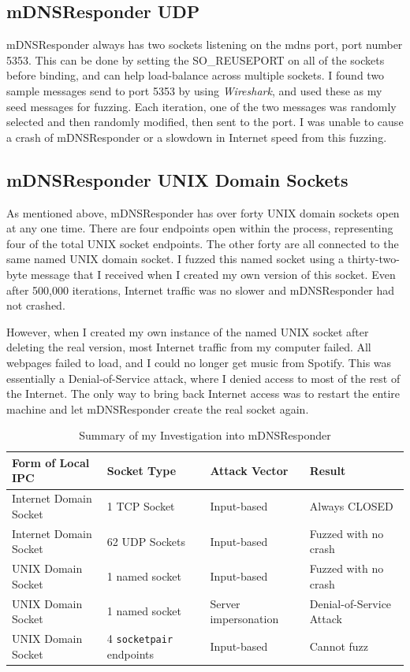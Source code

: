 \subsection{mDNSResponder UDP}
\label{sec:mdnsUdp}
mDNSResponder always has two sockets listening on the mdns port, port number 5353.  This can be done by setting the SO\_REUSEPORT on all of the sockets before binding, and can help load-balance across multiple sockets.  I found two sample messages send to port 5353 by using \textit{Wireshark}, and used these as my seed messages for fuzzing.  Each iteration, one of the two messages was randomly selected and then randomly modified, then sent to the port.  I was unable to cause a crash of mDNSResponder or a slowdown in Internet speed from this fuzzing.

\subsection{mDNSResponder UNIX Domain Sockets}
\label{sec:mdnsUnix}
As mentioned above, mDNSResponder has over forty UNIX domain sockets open at any one time.  There are four endpoints open within the process, representing four of the total UNIX socket endpoints.  The other forty are all connected to the same named UNIX domain socket.  I fuzzed this named socket using a thirty-two-byte message that I received when I created my own version of this socket.  Even after 500,000 iterations, Internet traffic was no slower and mDNSResponder had not crashed.

However, when I created my own instance of the named UNIX socket after deleting the real version, most Internet traffic from my computer failed.  All webpages failed to load, and I could no longer get music from Spotify.  This was essentially a Denial-of-Service attack, where I denied access to most of the rest of the Internet.  The only way to bring back Internet access was to restart the entire machine and let mDNSResponder create the real socket again.

\begin{table}
\centering
\begin{scriptsize}
\begin{tabular}{ l | l | l | l }
\textbf{Form of Local IPC} & \textbf{Socket Type} & \textbf{Attack Vector} & \textbf{Result} \\ \hline
Internet Domain Socket & 1 TCP Socket & Input-based & Always CLOSED \\ \hline
Internet Domain Socket & 62 UDP Sockets & Input-based & Fuzzed with no crash \\ \hline
UNIX Domain Socket & 1 named socket & Input-based & Fuzzed with no crash \\ \hline
UNIX Domain Socket & 1 named socket & Server impersonation & Denial-of-Service Attack \\ \hline
UNIX Domain Socket & 4 \texttt{socketpair} endpoints & Input-based & Cannot fuzz \\ \hline
\end{tabular}
\caption{Summary of my Investigation into mDNSResponder}
\label{tab:mdnsData}
\end{scriptsize}
\end{table} 


